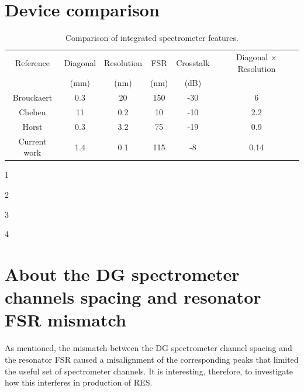 \documentclass[12pt,twoside,english]{book}
\renewcommand{\~}{\perispomeni}%
\providecommand{\tabularnewline}{\\}
\numberwithin{equation}{section}
\numberwithin{figure}{section}
\begin{document}
\section{Device comparison}
\begin{table}[h]
\begin{centering}
\begin{threeparttable}[b]
\begin{tabular}{cccccc}
\hline 
Reference & Diagonal & Resolution & FSR & Crosstalk & Diagonal $\times$ Resolution\tabularnewline
      & (mm)   & (nm)    & (nm) & (dB)   & 			  \tabularnewline
\hline
\hline 
Brouckaert\tnote{1} & 0.3   & 20     & 150 & -30    & 6              \tabularnewline
Cheben\tnote{2}   & 11    & 0.2    & 10  & -10    & 2.2             \tabularnewline
Horst\tnote{3}   & 0.3   & 3.2    & 75  & -19    & 0.9             \tabularnewline
Current work\tnote{4}    & 1.4   & 0.1    & 115 & -8    & 0.14            \tabularnewline
\hline
\end{tabular}\caption{Comparison of integrated spectrometer features.\label{table:device comparison}}
\par
\begin{tablenotes}
\small
\item [1] \cite{Brouckaert:2007p82} \newline 
\item [2] \cite{Cheben:2007p133}\newline 
\item [3] \cite{Horst:2009p1764} \newline 
\item [4] \cite{Kyotoku:2010p786} 
\end{tablenotes}
\end{threeparttable}
\end{centering}
\end{table}

\section{About the DG spectrometer channels spacing and resonator FSR mismatch}
As mentioned, the mismatch between the DG spectrometer channel spacing and the resonator FSR caused a misalignment of the corresponding peaks that limited the useful set of spectrometer channels. It is interesting, therefore, to investigate how this interferes in production of \gls{RES}.
\end{document}
